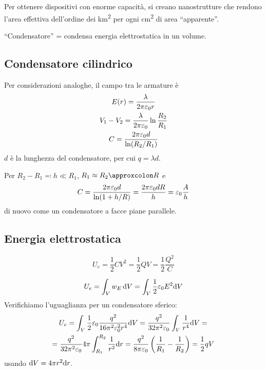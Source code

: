 Per ottenere dispositivi con enorme capacità, si creano nanostrutture che rendono l'area effettiva dell'ordine dei \unit{\kilo\metre\squared} per ogni \unit{\centi\metre\squared} di area ``apparente''.

``Condensatore'' = condensa energia elettrostatica in un volume.


\subsection{Condensatore cilindrico}

Per considerazioni analoghe, il campo tra le armature è
\begin{gather}
    E(r) = \frac{\lambda}{2\pi\varepsilon_0 r} \\
    V_1 - V_2 = \frac{\lambda}{2\pi\varepsilon_0} \ln\frac{R_2}{R_1} \\
    C = \frac{2\pi\varepsilon_0 d}{\ln(R_2/R_1)}
\end{gather}
$d$ è la lunghezza del condensatore, per cui $q = \lambda d$.

Per $R_2 - R_1 \eqcolon h \ll R_1$, $R_1 \approx R_2 \approxcolon R$ e
\begin{equation}
    C = \frac{2\pi\varepsilon_0 d}{\ln(1 + h/R)} = \frac{2\pi\varepsilon_0 d R}{h}
    = \varepsilon_0 \frac{A}{h}
\end{equation}
di nuovo come un condensatore a facce piane parallele.

\subsection{Energia elettrostatica}

\begin{equation}
    U_e = \frac{1}{2} C V^2 = \frac{1}{2} Q V = \frac{1}{2} \frac{Q^2}{C}
\end{equation}

\begin{equation}
    U_e = \int_V w_E \, \mathrm{d} V = \int_V \frac{1}{2}\varepsilon_0 E^2 \mathrm{d} V
\end{equation}
Verifichiamo l'uguaglianza per un condensatore sferico:
\begin{equation}
\begin{gathered}
    U_e = \int_V \frac{1}{2}\varepsilon_0 \frac{q^2}{16\pi^2\varepsilon_0^2 r^4} \mathrm{d} V
    = \frac{q^2}{32\pi^2\varepsilon_0} \int_V \frac{1}{r^4} \mathrm{d} V = \\
    = \frac{q^2}{32\pi^2\varepsilon_0} 4\pi \int_{R_1}^{R_2} \frac{1}{r^2} \mathrm{d} r
    = \frac{q^2}{8\pi\varepsilon_0} \left( \frac{1}{R_1} - \frac{1}{R_2} \right)
    = \frac{1}{2} q V
\end{gathered}
\end{equation}
usando $\mathrm{d} V = 4\pi r^2 \mathrm{d} r$.


